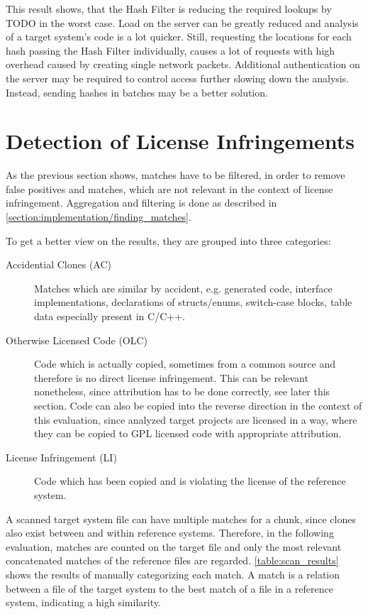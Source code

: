 This result shows, that the Hash Filter is reducing the required lookups by TODO in the worst case.
Load on the server can be greatly reduced and analysis of a target system's code is a lot quicker.
Still, requesting the locations for each hash passing the Hash Filter individually, causes a lot of requests with high overhead caused by creating single network packets.
Additional authentication on the server may be required to control access further slowing down the analysis.
Instead, sending hashes in batches may be a better solution.

\section{Detection of License Infringements}
As the previous section shows, matches have to be filtered, in order to remove false positives and matches, which are not relevant in the context of license infringement.
Aggregation and filtering is done as described in \autoref{section:implementation/finding_matches}.

To get a better view on the results, they are grouped into three categories:
\begin{description}
	\item [Accidential Clones (AC)]
		Matches which are similar by \glqq accident\grqq, e.g. generated code, interface implementations, declarations of structs/enums, switch-case blocks, table data especially present in C/C++.
	\item[Otherwise Licensed Code (OLC)]
		Code which is actually copied, sometimes from a common source and therefore is no direct license infringement.
		This can be relevant nonetheless, since attribution has to be done correctly, see later this section.
		Code can also be copied into the reverse direction in the context of this evaluation, since analyzed target projects are licensed in a way, where they can be copied to GPL licensed code with appropriate attribution.
	\item[License Infringement (LI)]
		Code which has been copied and is violating the license of the reference system.
\end{description}

A scanned target system file can have multiple matches for a chunk, since clones also exist between and within reference systems.
Therefore, in the following evaluation, matches are counted on the target file and only the most relevant concatenated matches of the reference files are regarded.
\autoref{table:scan_results} shows the results of manually categorizing each match.
A match is a relation between a file of the target system to the best match of a file in a reference system, indicating a high similarity.

